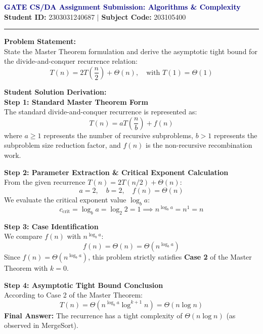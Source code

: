 \documentclass[11pt,a4paper]{article}
\begin{document}
\begin{center}
    {\large\bfseries\textcolor{navy}{GATE CS/DA Assignment Submission: Algorithms \& Complexity}}\\[0.2cm]
    \textbf{Student ID:} 2303031240687 \quad $\mid$ \quad \textbf{Subject Code:} 203105400
\end{center}
\hrule
\vspace{0.4cm}

\noindent\textbf{Problem Statement:}\\
State the Master Theorem formulation and derive the asymptotic tight bound for the divide-and-conquer recurrence relation:
\[
T(n) = 2T\left(\frac{n}{2}\right) + \Theta(n), \quad \text{with } T(1) = \Theta(1)
\]

\vspace{0.3cm}
\noindent\textbf{Student Solution Derivation:}\\
\textbf{Step 1: Standard Master Theorem Form}\\
The standard divide-and-conquer recurrence is represented as:
\[
T(n) = aT\left(\frac{n}{b}\right) + f(n)
\]
where $a \ge 1$ represents the number of recursive subproblems, $b > 1$ represents the subproblem size reduction factor, and $f(n)$ is the non-recursive recombination work.

\vspace{0.2cm}
\noindent\textbf{Step 2: Parameter Extraction \& Critical Exponent Calculation}\\
From the given recurrence $T(n) = 2T(n/2) + \Theta(n)$:
\[
a = 2, \quad b = 2, \quad f(n) = \Theta(n)
\]
We evaluate the critical exponent value $\log_b a$:
\[
c_{\text{crit}} = \log_b a = \log_2 2 = 1 \implies n^{\log_b a} = n^1 = n
\]

\vspace{0.2cm}
\noindent\textbf{Step 3: Case Identification}\\
We compare $f(n)$ with $n^{\log_b a}$:
\[
f(n) = \Theta(n) = \Theta\left(n^{\log_b a}\right)
\]
Since $f(n) = \Theta(n^{\log_b a})$, this problem strictly satisfies \textbf{Case 2} of the Master Theorem with $k = 0$.

\vspace{0.2cm}
\noindent\textbf{Step 4: Asymptotic Tight Bound Conclusion}\\
According to Case 2 of the Master Theorem:
\[
T(n) = \Theta\left(n^{\log_b a} \log^{k+1} n\right) = \Theta(n \log n)
\]
\textbf{Final Answer:} The recurrence has a tight complexity of $\Theta(n \log n)$ (as observed in MergeSort).
\end{document}
